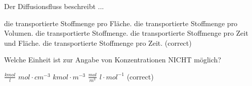 \documentclass[11pt]{exam}
\begin{document}
\begin{questions}
\vspace{3mm}\question Der Diffusionsfluss beschreibt ...

\begin{choices}
	\choice die transportierte Stoffmenge pro Fläche.
	\choice die transportierte Stoffmenge pro Volumen.
	\choice die transportierte Stoffmenge.
	\choice die transportierte Stoffmenge pro Zeit und Fläche.
	\choice die transportierte Stoffmenge pro Zeit. (correct)
\end{choices}

\vspace{3mm}\question Welche Einheit ist zur Angabe von Konzentrationen NICHT möglich?

\begin{choices}
	\choice \( \frac{kmol}{l} \)
	\choice \( mol \cdot cm^{-3} \)
	\choice \( kmol \cdot m^{-3} \)
	\choice \( \frac{mol}{m^3} \)
	\choice \( l \cdot mol^{-1} \) (correct)
\end{choices}

\vspace{3mm}\end{questions}
\end{document}
